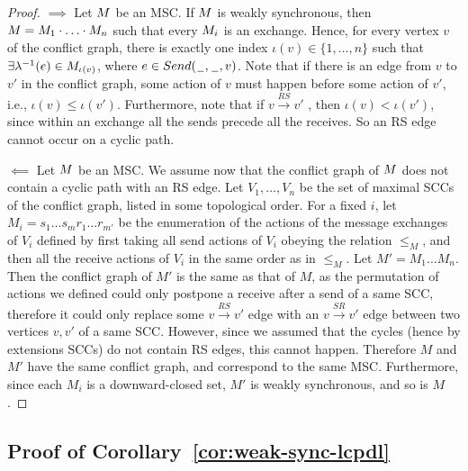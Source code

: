 \documentclass[a4paper,UKenglish,cleveref, autoref, thm-restate]{lipics-v2021}
\begin{document}
\begin{proof}
	$\implies$ Let $M$ be an MSC. If $M$ is weakly synchronous, then $M = M_1 \cdot \ldots \cdot M_n$ such that every $M_i$ is an exchange. Hence, for every vertex $v$ of the conflict graph, there is exactly one index $\iota(v) \in \{1,\ldots,n\}$ such that $\exists \lambda^{-1}(e) \in M_{\iota(v)}$, where $e \in Send(\hspace{0.1em}\underline{\hspace{0.5em}}\hspace{0.1em}, \hspace{0.1em}\underline{\hspace{0.5em}}\hspace{0.1em}, v)$. Note that if there is an edge from $v$ to $v'$ in the conflict
	graph, some action of $v$ must happen before some action of $v'$, i.e., $\iota(v) \leq \iota (v')$.
	 Furthermore, note that if $v \xrightarrow{RS} v'$ , then $\iota(v) < \iota(v')$, since within an exchange all the sends precede all the receives. So an RS edge cannot occur on a cyclic path.

	$\impliedby$ Let $M$ be an MSC. We assume now that the conflict graph of $M$ does not contain a cyclic path with an RS edge. Let $V_1, \ldots , V_n$ be the set of maximal SCCs of the conflict graph, listed in some
	topological order. For a fixed $i$, let $M_i = s_1 \ldots s_m r_1 \ldots r_{m'}$ be the enumeration of
	the actions of the message exchanges of $V_i$ defined by first taking all send actions
	of $V_i$ obeying the relation $\leq_M$, and then all the receive actions of
	$V_i$ in the same order as in $\leq_M$. Let $M' = M_1 \ldots M_n$. Then the conflict graph of $M'$ is the same as that of $M$, as the permutation of actions we defined could only postpone a receive after a send of a same SCC, therefore it could only replace some $v \xrightarrow{RS} v'$ edge with an $v \xrightarrow{SR} v'$ edge between two vertices $v,v'$ of a same SCC. However, since we assumed that the cycles (hence by extensions SCCs) do not contain RS edges, this cannot happen. Therefore $M$ and $M'$ have the same conflict graph, and correspond to the same MSC. Furthermore, since each $M_i$ is a downward-closed set, $M'$ is weakly synchronous, and so is $M$.
\end{proof}



\subsection{Proof of Corollary~\ref{cor:weak-sync-lcpdl}}

\weaksynclcpdl*
\end{document}
